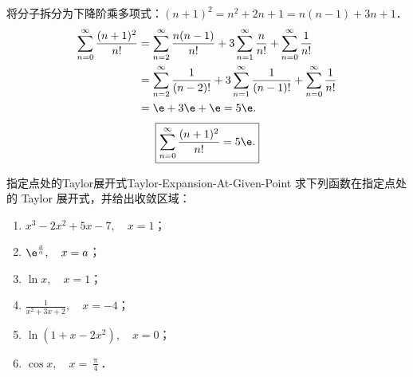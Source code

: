 \begin{solution}

    将分子拆分为下降阶乘多项式：$(n + 1)^2 = n^2 + 2n + 1 = n(n - 1) + 3n + 1$．
    \begin{equation}
        \begin{aligned}
            \sum_{n=0}^\infty \frac{(n + 1)^2}{n!} & = \sum_{n=2}^\infty \frac{n(n - 1)}{n!} + 3\sum_{n=1}^\infty \frac{n}{n!} + \sum_{n=0}^\infty \frac{1}{n!}      \\
                                                   & = \sum_{n=2}^\infty \frac{1}{(n - 2)!} + 3\sum_{n=1}^\infty \frac{1}{(n - 1)!} + \sum_{n=0}^\infty \frac{1}{n!} \\
                                                   & = \e + 3\e + \e = 5\e.
        \end{aligned}
    \end{equation}
    \begin{equation}
        \boxed{\sum_{n=0}^\infty \frac{(n + 1)^2}{n!} = 5\e.}
    \end{equation}
\end{solution}

\begin{problem}{指定点处的Taylor展开式}{Taylor-Expansion-At-Given-Point}
    求下列函数在指定点处的 Taylor 展开式，并给出收敛区域：
    \begin{enumerate}
        \item $x^3 - 2x^2 + 5x - 7, \quad x = 1$；
        \item $\e^{\frac{x}{a}}, \quad x = a$；
        \item $\ln x, \quad x = 1$；
        \item $\frac{1}{x^2 + 3x + 2}, \quad x = -4$；
        \item $\ln(1 + x - 2x^2), \quad x = 0$；
        \item $\cos x, \quad x = \frac{\uppi}{4}$．
    \end{enumerate}
\end{problem}

